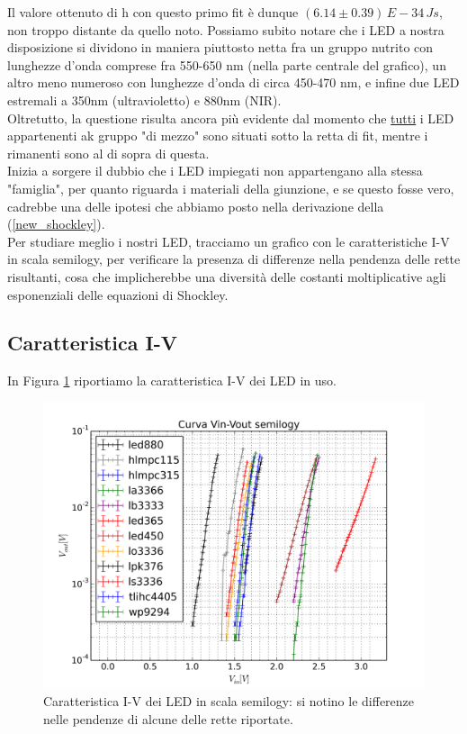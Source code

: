 \documentclass[journal, a4paper]{IEEEtran}
\begin{document}
Il valore ottenuto di h con questo primo fit è dunque $(6.14 \pm 0.39 ) \, E-34 \, Js$, non troppo distante da quello noto. Possiamo subito notare che i LED a nostra disposizione si dividono in maniera piuttosto netta fra un gruppo nutrito con lunghezze d'onda comprese fra 550-650 nm (nella parte centrale del grafico), un altro meno numeroso con lunghezze d'onda di circa 450-470 nm, e infine due LED estremali a 350nm (ultravioletto) e 880nm (NIR).\\
Oltretutto, la questione risulta ancora più evidente dal momento che \underline{tutti} i LED appartenenti ak gruppo "di mezzo" sono situati sotto la retta di fit, mentre i rimanenti sono al di sopra di questa.\\
Inizia a sorgere il dubbio che i LED impiegati non appartengano alla stessa "famiglia", per quanto riguarda i materiali della giunzione, e se questo fosse vero, cadrebbe una delle ipotesi che abbiamo posto nella derivazione della (\ref{new_shockley}).\\

Per studiare meglio i nostri LED, tracciamo un grafico con le caratteristiche I-V in scala semilogy, per verificare la presenza di differenze nella pendenza delle rette risultanti, cosa che implicherebbe una diversità delle costanti moltiplicative agli esponenziali delle equazioni di Shockley.

\subsection{Caratteristica I-V}

In Figura \ref{fig:tuttiled} riportiamo la caratteristica I-V dei LED in uso.

\begin{figure}
\centering
\includegraphics[width=1\linewidth]{./tuttiled}
\caption{Caratteristica I-V dei LED in scala semilogy: si notino le differenze nelle pendenze di alcune delle rette riportate.}
\label{fig:tuttiled}
\end{figure}
 
\end{document}
